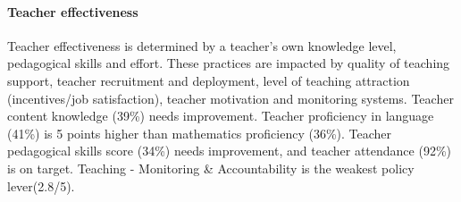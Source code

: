 \documentclass[
  twocolumn]{article}
\begin{document}
\hypertarget{teacher-effectiveness}{%
\paragraph{\texorpdfstring{\textbf{Teacher
effectiveness}}{Teacher effectiveness}}\label{teacher-effectiveness}}

Teacher effectiveness is determined by a teacher's own knowledge level,
pedagogical skills and effort. These practices are impacted by quality
of teaching support, teacher recruitment and deployment, level of
teaching attraction (incentives/job satisfaction), teacher motivation
and monitoring systems. Teacher content knowledge (39\%) needs
improvement. Teacher proficiency in language (41\%) is 5 points higher
than mathematics proficiency (36\%). Teacher pedagogical skills score
(34\%) needs improvement, and teacher attendance (92\%) is on target.
Teaching - Monitoring \& Accountability is the weakest policy
lever(2.8/5).
\end{document}
